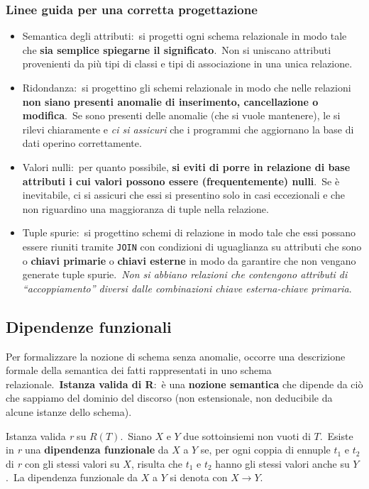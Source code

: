 \subsubsection{Linee guida per una corretta progettazione}

\begin{itemize}
	\item Semantica degli attributi:\ si progetti ogni schema relazionale in modo tale che \textbf{sia semplice spiegarne il significato}.\ Non si uniscano attributi provenienti da più tipi di classi e tipi di associazione in una unica relazione.
	\item Ridondanza:\ si progettino gli schemi relazionale in modo che nelle relazioni \textbf{non siano presenti anomalie di inserimento, cancellazione o modifica}.\ Se sono presenti delle anomalie (che si vuole mantenere), le si rilevi chiaramente e \textit{ci si assicuri} che i programmi che aggiornano la base di dati operino correttamente.
	\item Valori nulli:\ per quanto possibile, \textbf{si eviti di porre in relazione di base attributi i cui valori possono essere (frequentemente) nulli}.\ Se è inevitabile, ci si assicuri che essi si presentino solo in casi eccezionali e che non riguardino una maggioranza di tuple nella relazione.\
	\item Tuple spurie:\ si progettino schemi di relazione in modo tale che essi possano essere riuniti tramite \texttt{JOIN} con condizioni di uguaglianza su attributi che sono o \textbf{chiavi primarie} o \textbf{chiavi esterne} in modo da garantire che non vengano generate tuple spurie.\ \textit{Non si abbiano relazioni che contengono attributi di ``accoppiamento'' diversi dalle combinazioni chiave esterna-chiave primaria}.
\end{itemize}

\subsection{Dipendenze funzionali}

Per formalizzare la nozione di schema senza anomalie, occorre una descrizione formale della semantica dei fatti rappresentati in uno schema relazionale.\
\textbf{Istanza valida di R}:\ è una \textbf{nozione semantica} che dipende da ciò che sappiamo del dominio del discorso (non estensionale, non deducibile da alcune istanze dello schema).\

\noindent Istanza valida \textit{r} su $R(T)$.\
Siano $X$ e $Y$ due sottoinsiemi non vuoti di $T$.\
Esiste in \textit{r} una \textbf{dipendenza funzionale} da $X$ a $Y$ se, per ogni coppia di ennuple $t_1$ e $t_2$ di \textit{r} con gli stessi valori su $X$, risulta che $t_1$ e $t_2$ hanno gli stessi valori anche su $Y$.\
La dipendenza funzionale da $X$ a $Y$ si denota con $X \rightarrow Y$.

